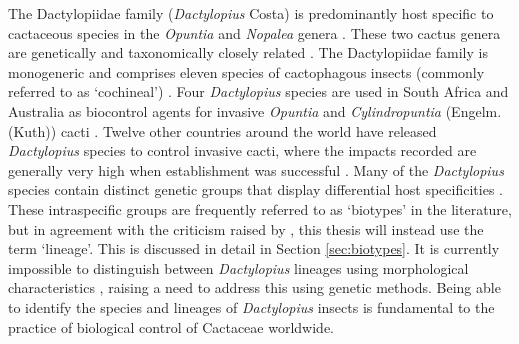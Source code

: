 The Dactylopiidae family (\textit{Dactylopius} Costa) is predominantly host specific to cactaceous species in the \textit{Opuntia} and \textit{Nopalea} genera \citep{DeLotto1974, Campana2015, VanDam2015}. These two cactus genera are genetically and taxonomically closely related \citep{griffith2009phylogeny}. The Dactylopiidae family is monogeneric and comprises eleven species of cactophagous insects (commonly referred to as `cochineal') \citep{Campana2015, VanDam2015}. Four \textit{Dactylopius} species are used in South Africa and Australia as biocontrol agents for invasive \textit{Opuntia} and \textit{Cylindropuntia} (Engelm.(Kuth)) cacti \citep{zachTable}. Twelve other countries around the world have released \textit{Dactylopius} species to control invasive cacti, where the impacts recorded are generally very high when establishment was successful \citep{Winston2014BiologicalWeeds.}. Many of the \textit{Dactylopius} species contain distinct genetic groups that display differential host specificities \citep{Volchansky1999, Mathenge2009,  Mathenge2010a, Mathenge2010, Jones2015, Mathenge2015}. These intraspecific groups are frequently referred to as `biotypes' in the literature, but in agreement with the criticism raised by \citet{Downie2010}, this thesis will instead use the term `lineage'. This is discussed in detail in Section \ref{sec:biotypes}. It is currently impossible to distinguish between \textit{Dactylopius} lineages using morphological characteristics \citep{Mathenge2015, jones2016host}, raising a need to address this using genetic methods. Being able to identify the species and lineages of \textit{Dactylopius} insects is fundamental to the practice of biological control of Cactaceae worldwide.  